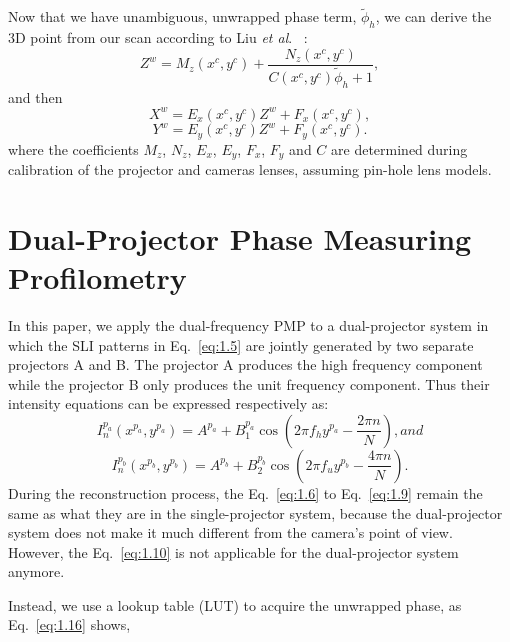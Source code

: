 \documentclass[]{spie}  %
\begin{document}
Now that we have unambiguous, unwrapped phase term, $\tilde{\phi}_h$, we can derive the 3D point from our scan according to Liu \textit{et al}. ~\cite{liuk10}:
\begin{equation}\label{eq:1.11}
	Z^w = M_z(x^c, y^c) + \frac{N_z(x^c, y^c)}{C(x^c, y^c) \tilde{\phi}_h + 1},
\end{equation}
and then
\begin{equation}\label{eq:1.12}
	X^w = E_x(x^c, y^c)Z^w + F_x(x^c, y^c),
\end{equation}
\begin{equation}\label{eq:1.13}
	Y^w = E_y(x^c, y^c)Z^w + F_y(x^c, y^c).
\end{equation}
where the coefficients $M_z$, $N_z$, $E_x$, $E_y$, $F_x$, $F_y$ and $C$ are determined during calibration of the projector and cameras lenses, assuming pin-hole lens models.


\section{Dual-Projector Phase Measuring Profilometry}
In this paper, we apply the dual-frequency PMP to a dual-projector system in which the SLI patterns in Eq.~\eqref{eq:1.5} are jointly generated by two separate projectors A and B. The projector A produces the high frequency component while the projector B only produces the unit frequency component. Thus their intensity equations can be expressed respectively as:
   \begin{equation} \label{eq:1.14}
  	I^{p_a}_n(x^{p_a}, y^{p_a}) = A^{p_a} + B^{p_a}_1\cos\left(2\pi f_h y^{p_a} - \frac{2\pi n}{N}\right), and 
  \end{equation}
   \begin{equation} \label{eq:1.15}
  	I^{p_b}_n(x^{p_b}, y^{p_b}) = A^{p_b} + B^{p_b}_2\cos\left(2\pi f_u y^{p_b} - \frac{4\pi n}{N}\right).
  \end{equation}
During the reconstruction process, the Eq.~\eqref{eq:1.6} to Eq.~\eqref{eq:1.9} remain the same as what they are in the single-projector system, because the dual-projector system does not make it much different from the camera's point of view. However, the Eq.~\eqref{eq:1.10} is not applicable for the dual-projector system anymore. 

Instead, we use a lookup table (LUT) to acquire the unwrapped phase, as Eq.~\eqref{eq:1.16} shows,
\end{document}

